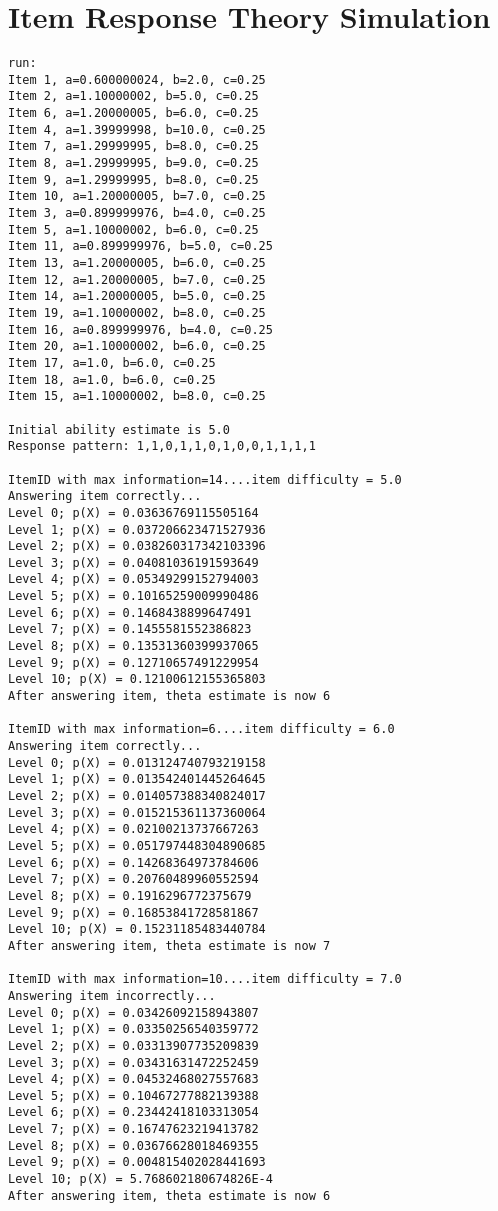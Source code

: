 \chapter{Item Response Theory Simulation}
\label{chap:irt-simulation}
\begin{verbatim}
run:
Item 1, a=0.600000024, b=2.0, c=0.25
Item 2, a=1.10000002, b=5.0, c=0.25
Item 6, a=1.20000005, b=6.0, c=0.25
Item 4, a=1.39999998, b=10.0, c=0.25
Item 7, a=1.29999995, b=8.0, c=0.25
Item 8, a=1.29999995, b=9.0, c=0.25
Item 9, a=1.29999995, b=8.0, c=0.25
Item 10, a=1.20000005, b=7.0, c=0.25
Item 3, a=0.899999976, b=4.0, c=0.25
Item 5, a=1.10000002, b=6.0, c=0.25
Item 11, a=0.899999976, b=5.0, c=0.25
Item 13, a=1.20000005, b=6.0, c=0.25
Item 12, a=1.20000005, b=7.0, c=0.25
Item 14, a=1.20000005, b=5.0, c=0.25
Item 19, a=1.10000002, b=8.0, c=0.25
Item 16, a=0.899999976, b=4.0, c=0.25
Item 20, a=1.10000002, b=6.0, c=0.25
Item 17, a=1.0, b=6.0, c=0.25
Item 18, a=1.0, b=6.0, c=0.25
Item 15, a=1.10000002, b=8.0, c=0.25

Initial ability estimate is 5.0
Response pattern: 1,1,0,1,1,0,1,0,0,1,1,1,1

ItemID with max information=14....item difficulty = 5.0
Answering item correctly...
Level 0; p(X) = 0.03636769115505164
Level 1; p(X) = 0.037206623471527936
Level 2; p(X) = 0.038260317342103396
Level 3; p(X) = 0.04081036191593649
Level 4; p(X) = 0.05349299152794003
Level 5; p(X) = 0.10165259009990486
Level 6; p(X) = 0.1468438899647491
Level 7; p(X) = 0.1455581552386823
Level 8; p(X) = 0.13531360399937065
Level 9; p(X) = 0.12710657491229954
Level 10; p(X) = 0.12100612155365803
After answering item, theta estimate is now 6

ItemID with max information=6....item difficulty = 6.0
Answering item correctly...
Level 0; p(X) = 0.013124740793219158
Level 1; p(X) = 0.013542401445264645
Level 2; p(X) = 0.014057388340824017
Level 3; p(X) = 0.015215361137360064
Level 4; p(X) = 0.02100213737667263
Level 5; p(X) = 0.051797448304890685
Level 6; p(X) = 0.14268364973784606
Level 7; p(X) = 0.20760489960552594
Level 8; p(X) = 0.1916296772375679
Level 9; p(X) = 0.16853841728581867
Level 10; p(X) = 0.15231185483440784
After answering item, theta estimate is now 7

ItemID with max information=10....item difficulty = 7.0
Answering item incorrectly...
Level 0; p(X) = 0.03426092158943807
Level 1; p(X) = 0.03350256540359772
Level 2; p(X) = 0.03313907735209839
Level 3; p(X) = 0.03431631472252459
Level 4; p(X) = 0.04532468027557683
Level 5; p(X) = 0.10467277882139388
Level 6; p(X) = 0.23442418103313054
Level 7; p(X) = 0.16747623219413782
Level 8; p(X) = 0.03676628018469355
Level 9; p(X) = 0.004815402028441693
Level 10; p(X) = 5.768602180674826E-4
After answering item, theta estimate is now 6


\end{verbatim}
